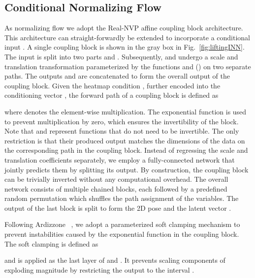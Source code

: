 \documentclass[10pt,twocolumn,letterpaper]{article}
\begin{document}
\subsection{Conditional Normalizing Flow}
As normalizing flow we adopt the Real-NVP \cite{DBLP:conf/iclr/DinhSB17} affine coupling block architecture.
This architecture can straight-forwardly be extended to incorporate a conditional input \cite{Ardizzone2019a,winkler2019learning}.
A single coupling block is shown in the gray box in Fig.~\ref{fig:liftingINN}. The input  is split into two parts  and . Subsequently,  and  undergo a scale and translation transformation parameterized by the functions  and  () on two separate paths. The outputs  and  are concatenated to form the overall output of the coupling block. Given the heatmap condition , further encoded into the conditioning vector , the forward path of a coupling block is defined as

where  denotes the element-wise multiplication. The exponential function is used to prevent multiplication by zero, which ensures the invertibility of the block. Note that  and  represent functions that do not need to be invertible. The only restriction is that their produced output matches the dimensions of the data on the corresponding path in the coupling block. Instead of regressing the scale and translation coefficients separately, we employ a fully-connected network that jointly predicts them by splitting its output. 
By construction, the coupling block can be trivially inverted without any computational overhead.
The overall network consists of multiple chained blocks, each followed by a predefined random permutation which shuffles the path assignment of the variables.
The output of the last block is split to form the 2D pose  and the latent vector .

Following Ardizzone \etal~\cite{Ardizzone2019a}, we adopt a parameterized soft clamping mechanism to prevent instabilities caused by the exponential function in the coupling block. The soft clamping is defined as

and is applied as the last layer of  and . It prevents scaling components of exploding magnitude by restricting the output to the interval .
\end{document}

